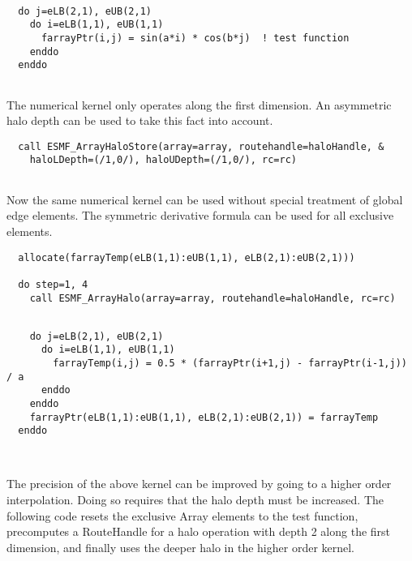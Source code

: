 
 \begin{verbatim}
  
  do j=eLB(2,1), eUB(2,1)
    do i=eLB(1,1), eUB(1,1)
      farrayPtr(i,j) = sin(a*i) * cos(b*j)  ! test function
    enddo
  enddo
 
\end{verbatim}
 

   The numerical kernel only operates along the first dimension. An
   asymmetric halo depth can be used to take this fact into account. 

 \begin{verbatim}
  call ESMF_ArrayHaloStore(array=array, routehandle=haloHandle, &
    haloLDepth=(/1,0/), haloUDepth=(/1,0/), rc=rc)
 
\end{verbatim}
 

   Now the same numerical kernel can be used without special treatment of
   global edge elements. The symmetric derivative formula can be used for
   all exclusive elements. 

 \begin{verbatim}
  allocate(farrayTemp(eLB(1,1):eUB(1,1), eLB(2,1):eUB(2,1)))

  do step=1, 4
    call ESMF_ArrayHalo(array=array, routehandle=haloHandle, rc=rc)
 
\end{verbatim}
 

 \begin{verbatim}
    do j=eLB(2,1), eUB(2,1)
      do i=eLB(1,1), eUB(1,1)
        farrayTemp(i,j) = 0.5 * (farrayPtr(i+1,j) - farrayPtr(i-1,j)) / a
      enddo
    enddo
    farrayPtr(eLB(1,1):eUB(1,1), eLB(2,1):eUB(2,1)) = farrayTemp
  enddo
  
 
\end{verbatim}
 

   The precision of the above kernel can be improved by going to 
   a higher order interpolation. Doing so requires that the halo depth must be
   increased. The following code resets the exclusive Array elements
   to the test function, precomputes a RouteHandle for a halo operation
   with depth 2 along the first dimension, and finally uses the deeper halo
   in the higher order kernel. 


